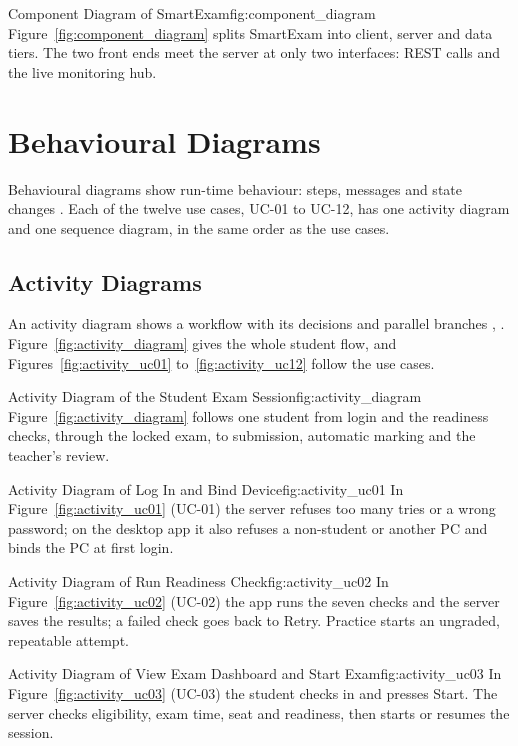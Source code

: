%
{Component Diagram of SmartExam}{fig:component_diagram}%
{Figure~\ref{fig:component_diagram} splits SmartExam into client, server and data tiers. The two front ends meet the server at only two interfaces: REST calls and the live monitoring hub.}

\section{Behavioural Diagrams}
\label{sec:behavioural_diagrams}
Behavioural diagrams show run-time behaviour: steps, messages and state changes \cite[Annex~A]{omg_uml251}. Each of the twelve use cases, UC-01 to UC-12, has one activity diagram and one sequence diagram, in the same order as the use cases.

\subsection{Activity Diagrams}
An activity diagram shows a workflow with its decisions and parallel branches \cite[Cl.~15]{omg_uml251}, \cite{activity_diagram_vp}. Figure~\ref{fig:activity_diagram} gives the whole student flow, and Figures~\ref{fig:activity_uc01} to~\ref{fig:activity_uc12} follow the use cases.

%
{Activity Diagram of the Student Exam Session}{fig:activity_diagram}%
{Figure~\ref{fig:activity_diagram} follows one student from login and the readiness checks, through the locked exam, to submission, automatic marking and the teacher's review.}

%
{Activity Diagram of Log In and Bind Device}{fig:activity_uc01}%
{In Figure~\ref{fig:activity_uc01} (UC-01) the server refuses too many tries or a wrong password; on the desktop app it also refuses a non-student or another PC and binds the PC at first login.}

%
{Activity Diagram of Run Readiness Check}{fig:activity_uc02}%
{In Figure~\ref{fig:activity_uc02} (UC-02) the app runs the seven checks and the server saves the results; a failed check goes back to Retry. Practice starts an ungraded, repeatable attempt.}

%
{Activity Diagram of View Exam Dashboard and Start Exam}{fig:activity_uc03}%
{In Figure~\ref{fig:activity_uc03} (UC-03) the student checks in and presses Start. The server checks eligibility, exam time, seat and readiness, then starts or resumes the session.}

